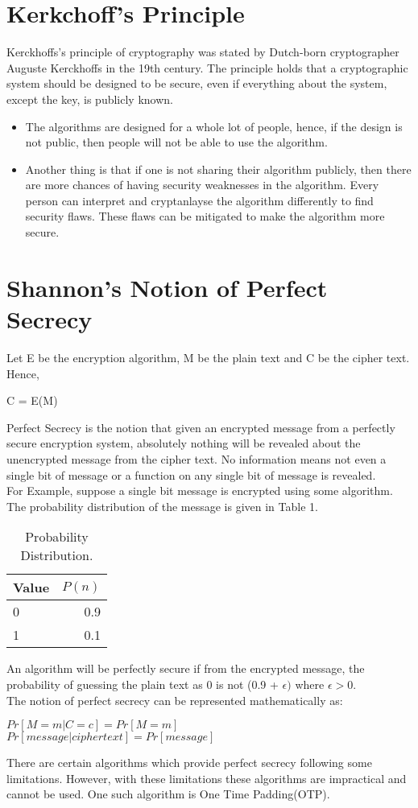 \documentclass[11pt]{article}
\begin{document}
\section{Kerkchoff's Principle}
Kerckhoffs's principle of cryptography was stated by Dutch-born cryptographer Auguste Kerckhoffs in the 19th century. The principle holds that a cryptographic system should be designed to be secure, even if everything about the system, except the key, is publicly known.
\begin{itemize}
    \item The algorithms are designed for a whole lot of people, hence, if the design is not public, then people will not be able to use the algorithm.
    \item Another thing is that if one is not sharing their algorithm publicly, then there are more chances of having security weaknesses in the algorithm. Every person can interpret and cryptanlayse the algorithm differently to find security flaws. These flaws can be mitigated to make the algorithm more secure.
\end{itemize}

\section{Shannon's Notion of Perfect Secrecy}
Let E be the encryption algorithm, M be the plain text and C be the cipher text. Hence,
\begin{center}
    C = E(M)
\end{center}

Perfect Secrecy is the notion that given an encrypted message from a perfectly secure encryption system, absolutely nothing will be revealed about the unencrypted message from the cipher text. No information means not even a single bit of message or a function on any single bit of message is revealed.\\ For Example, suppose a single bit message is encrypted using some algorithm. The probability distribution of the message is given in Table 1.
\begin{table}[h]
\centering
\begin{tabular}{l|r}
Value & $P(n)$ \\\hline
0 & 0.9 \\
1 & 0.1
\end{tabular}
\caption{\label{tab:widgets} Probability Distribution.}
\end{table}
An algorithm will be perfectly secure if from the encrypted message, the probability of guessing the plain text as 0 is not (0.9 + $\epsilon)$ where $\epsilon > 0.$\\
The notion of perfect secrecy can be represented mathematically as:
\begin{center}
    $Pr[M=m|C=c] = Pr[M=m]$\\
    $Pr[message | cipher text] = Pr[message]$
\end{center}
There are certain algorithms which provide perfect secrecy following some limitations. However, with these limitations these algorithms are impractical and cannot be used. One such algorithm is One Time Padding(OTP). 
\end{document}
